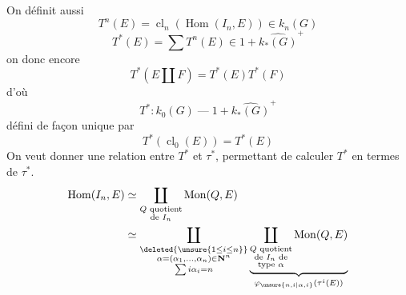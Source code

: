 On définit aussi
\[
T^n(E)=\operatorname{cl}_n(\operatorname{Hom}(I_n,E))\in k_n(G)
\]
\[
T^*(E)=\sum T^n(E)\in1+\widehat{k_*(G)}^+
\]
on donc encore
\[
T^*(E\amalg F)=T^*(E)T^*(F)
\]
d'où
\[
T^*:k_0(G)\mathbin{\text{---}}1+\widehat{k_*(G)}^+
\]
défini de façon unique par
\[
T^*(\operatorname{cl}_0(E))=T^*(E)
\]
On veut donner une relation entre $T^*$ et $\tau^*$,
permettant de calculer $T^*$ en termes de $\tau^*$.
\[
\begin{aligned}
\operatorname{Hom}(I_n,E)&\simeq\coprod_{\substack{Q\text{ quotient}\\\text{de }I_n}}\operatorname{Mon}(Q,E)\\
&\simeq\coprod_{\substack{\deleted{\unsure{1\leq i\leq n}}\\\alpha=(\alpha_1,\ldots,\alpha_n)\in\mathbf N^n\\\sum i\alpha_i=n}}\underbrace{\coprod_{\substack{Q\text{ quotient}\\\text{de }I_n\text{ de}\\\text{type }\alpha}}\operatorname{Mon}(Q,E)}_{\varphi_{\unsure{n,i|\alpha,i}}(\tau^i(E))}
\end{aligned}
\]
